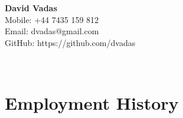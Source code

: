 \documentclass[]{article}
\begin{document}
\hrulefill
\begin{center}
\Huge{\textbf{David Vadas}}\\
\vspace{0.5cm}
\normalsize
Mobile: +44 7435 159 812\\
Email: dvadas@gmail.com\\ %
GitHub: https://github.com/dvadas
\end{center}
\hrulefill
\\
\vspace{0.08in}

\section*{Employment History}
\setlength{\tabcolsep}{0.1cm}
\end{document}
